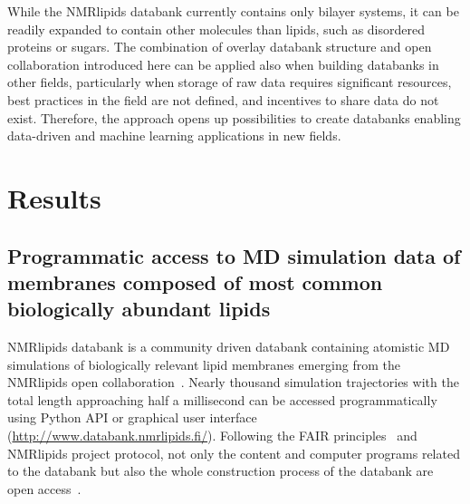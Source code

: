 \documentclass[fleqn,10pt]{wlscirep}
\begin{document}
While the NMRlipids databank currently contains only bilayer systems, it can be readily expanded to contain other molecules than lipids, such as disordered proteins or sugars. 
The combination of overlay databank structure and open collaboration introduced here can be applied also when building databanks in other fields,  
particularly when storage of raw data requires significant resources, best practices in the field are not defined, and incentives to share data do not exist.
Therefore, the approach opens up possibilities to create databanks enabling data-driven and machine learning applications in new fields. 




\section{Results}

\subsection{Programmatic access to MD simulation data of membranes composed of most common biologically abundant lipids}
NMRlipids databank is a community driven databank containing atomistic MD simulations of biologically relevant lipid membranes emerging from the NMRlipids open collaboration~\cite{botan15,ollila16,catte16,antila19,bacle21}. Nearly thousand simulation trajectories with the total length approaching half a millisecond can be accessed programmatically using Python API or graphical user interface (\url{http://www.databank.nmrlipids.fi/}). 
Following the FAIR principles~\cite{wilkinson16} and NMRlipids project protocol, not only the content and computer programs related to the databank but also the whole construction process of the databank are open access~\cite{botan15}. 
\end{document}
